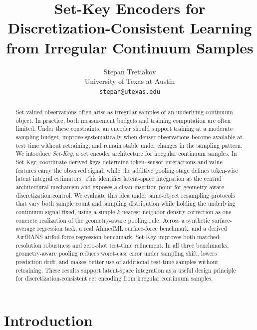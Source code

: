 \documentclass[11pt]{article}
\title{Set-Key Encoders for Discretization-Consistent Learning from Irregular Continuum Samples}
\author{
  Stepan Tretiakov \\
  University of Texas at Austin \\
  \texttt{stepan@utexas.edu}
}
\date{}
\begin{document}
\maketitle

\begin{abstract}
Set-valued observations often arise as irregular samples of an underlying
continuum object.  In practice, both measurement budgets and training
computation are often limited.  Under these constraints, an encoder should
support training at a moderate sampling budget, improve systematically when
denser observations become available at test time without retraining, and
remain stable under changes in the sampling pattern.  We introduce
\emph{Set-Key}, a set encoder architecture
for irregular continuum samples.  In Set-Key,
coordinate-derived keys determine token--sensor interactions and value features
carry the observed signal, while the additive pooling stage defines token-wise
latent integral estimators.  This identifies latent-space integration as the
central architectural mechanism and exposes a clean insertion point for
geometry-aware discretization control.  We evaluate this idea under
same-object resampling protocols that vary both sample count and sampling
distribution while holding the underlying continuum signal fixed, using a
simple $k$-nearest-neighbor density correction as one concrete realization of
the geometry-aware pooling rule.  Across a synthetic surface-average
regression task, a real AhmedML surface-force benchmark, and a derived
AirfRANS airfoil-force regression benchmark, Set-Key improves both
matched-resolution robustness and zero-shot test-time refinement.  In all
three benchmarks, geometry-aware pooling reduces worst-case error under
sampling shift, lowers prediction drift, and makes better use of additional
test-time samples without retraining.  These results support latent-space
integration as a useful design principle for discretization-consistent set
encoding from irregular continuum samples.
\end{abstract}

\section{Introduction}
\label{sec:introduction}
\end{document}
